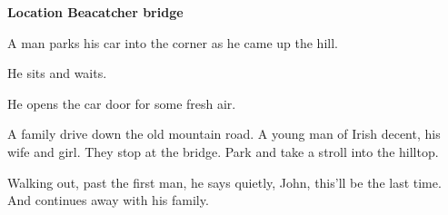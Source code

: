 

{\bf Location Beacatcher bridge}

A man parks his car into the corner as he came up the hill.

He sits and waits.

He opens the car door for some fresh air.

A family drive down the old mountain road.  A young man of Irish
decent, his wife and girl.  They stop at the bridge.  Park and take a
stroll into the hilltop.

Walking out, past the first man, he says quietly, John, this'll be the
last time.  And continues away with his family.

\bye
